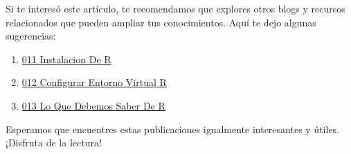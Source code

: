 \documentclass[
  jou,
  floatsintext,
  longtable,
  a4paper,
  nolmodern,
  notxfonts,
  notimes,
  12pt,
  colorlinks=true,linkcolor=blue,citecolor=blue,urlcolor=blue]{apa7}
\providecommand{\tightlist}{%
  \setlength{\itemsep}{0pt}\setlength{\parskip}{0pt}}
\begin{document}
Si te interesó este artículo, te recomendamos que explores otros blogs y
recursos relacionados que pueden ampliar tus conocimientos. Aquí te dejo
algunas sugerencias:

\begin{enumerate}
\def\labelenumi{\arabic{enumi}.}
\tightlist
\item
  \href{https://numerus-scriptum.netlify.app/r/2020-06-10-011-instalacion-de-r/index.pdf}{}
  \href{https://numerus-scriptum.netlify.app/r/2020-06-10-011-instalacion-de-r}{011
  Instalacion De R}
\item
  \href{https://numerus-scriptum.netlify.app/r/2020-06-10-012-configurar-entorno-virtual-r/index.pdf}{}
  \href{https://numerus-scriptum.netlify.app/r/2020-06-10-012-configurar-entorno-virtual-r}{012
  Configurar Entorno Virtual R}
\item
  \href{https://numerus-scriptum.netlify.app/r/2020-06-10-013-lo-que-debemos-saber-de-r/index.pdf}{}
  \href{https://numerus-scriptum.netlify.app/r/2020-06-10-013-lo-que-debemos-saber-de-r}{013
  Lo Que Debemos Saber De R}
\end{enumerate}

Esperamos que encuentres estas publicaciones igualmente interesantes y
útiles. ¡Disfruta de la lectura!
\end{document}
